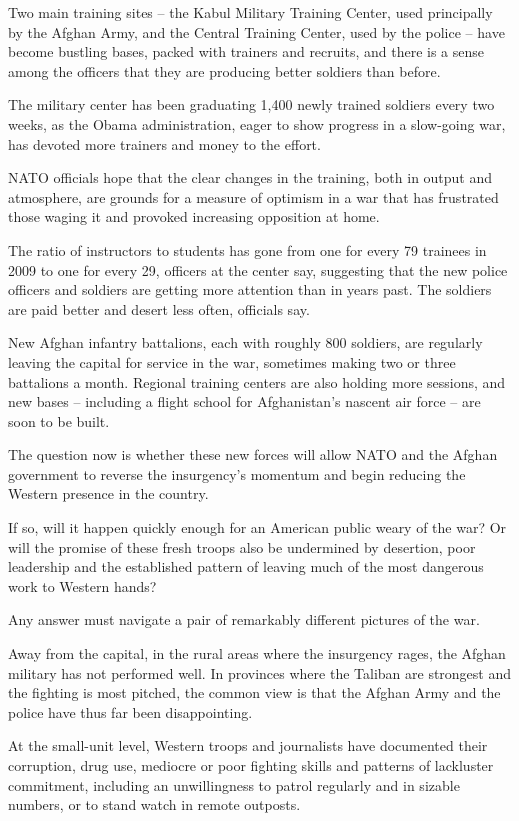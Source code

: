 ﻿\documentclass[12pt]{article}
\begin{document}
Two main training sites -- the Kabul Military Training Center, used principally by the Afghan Army,
and the Central Training Center, used by the police -- have become bustling bases, packed with
trainers and recruits, and there is a sense among the officers that they are producing better
soldiers than before.

The military center has been graduating 1,400 newly trained soldiers every two weeks, as the Obama
administration, eager to show progress in a slow-going war, has devoted more trainers and money to
the effort.

NATO officials hope that the clear changes in the training, both in output and atmosphere, are
grounds for a measure of optimism in a war that has frustrated those waging it and provoked
increasing opposition at home.

The ratio of instructors to students has gone from one for every 79 trainees in 2009 to one for
every 29, officers at the center say, suggesting that the new police officers and soldiers are
getting more attention than in years past. The soldiers are paid better and desert less often,
officials say.

New Afghan infantry battalions, each with roughly 800 soldiers, are regularly leaving the capital
for service in the war, sometimes making two or three battalions a month. Regional training centers
are also holding more sessions, and new bases -- including a flight school for Afghanistan's nascent
air force -- are soon to be built.

The question now is whether these new forces will allow NATO and the Afghan government to reverse
the insurgency's momentum and begin reducing the Western presence in the country.

If so, will it happen quickly enough for an American public weary of the war? Or will the promise of
these fresh troops also be undermined by desertion, poor leadership and the established pattern of
leaving much of the most dangerous work to Western hands?

Any answer must navigate a pair of remarkably different pictures of the war.

Away from the capital, in the rural areas where the insurgency rages, the Afghan military has not
performed well. In provinces where the Taliban are strongest and the fighting is most pitched, the
common view is that the Afghan Army and the police have thus far been disappointing.

At the small-unit level, Western troops and journalists have documented their corruption, drug use,
mediocre or poor fighting skills and patterns of lackluster commitment, including an unwillingness
to patrol regularly and in sizable numbers, or to stand watch in remote outposts.
\end{document}

